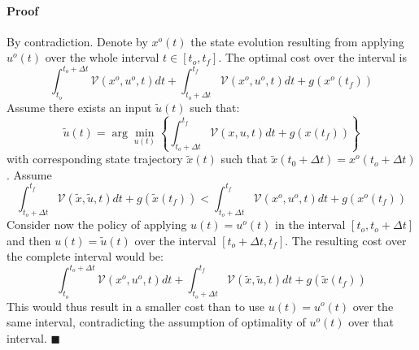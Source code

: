 \documentclass{book}
\newcommand{\argmin}{\arg\!\min}
\begin{document}
\paragraph{Proof}
By contradiction.
Denote by $ x^{ o } (t)  $ the state evolution resulting from 
applying $ u^{ o } (t)  $ over the whole interval $ t \in \left[ t_{ o }, t_{ f } \right]   $.
The optimal cost over the interval is
\begin{equation}
\int_{t_{ o }}^{t_{ o } + \Delta t} \mathcal{V} (x^{ o }, u^{ o }, t) dt +
\int_{t_{ o }+ \Delta t}^{t_{ f }} \mathcal{V} (x^{ o }, u^{ o }, t) dt + g (x^{ o } (t_{ f }))
\end{equation}
Assume there exists an input $ \tilde{u} (t)  $ such that:
\begin{equation}
\tilde{u} (t) = \argmin_{u (t)} \left\{ 
\int_{t_{ o } + \Delta t}^{t_{ f }} \mathcal{V} (x, u, t) dt + g (x (t_{ f }))
\right\} 
\end{equation}
with corresponding state trajectory $ \tilde{x} (t)  $ such that
$ \tilde{x} ( t_{ 0 } + \Delta t) = x^{ o } (t_{ o } + \Delta t)  $.
Assume
\begin{equation}
\int_{t_{ o } + \Delta t}^{t_{ f }} \mathcal{V} (\tilde{x}, \tilde{u}, t) dt + g (\tilde{x} (t_{ f })) <
\int_{t_{ o }+ \Delta t}^{t_{ f }} \mathcal{V} (x^{ o }, u^{ o }, t) dt + g (x^{ o } (t_{ f }))
\end{equation}
Consider now the policy of applying $ u (t) = u^{ o } (t)  $ in the interval
$ \left[ t_{ o }, t_{ o } + \Delta t \right]   $ and then
$ u (t) = \tilde{u} (t)  $ over the interval $ \left[ t_{ o } + \Delta t, t_{ f } \right]   $.
The resulting cost over the complete interval would be:
\begin{equation}
\int_{t_{ o }}^{t_{ o } + \Delta t} \mathcal{V} (x^{ o }, u^{ o }, t) dt +
\int_{t_{ o } + \Delta t}^{t_{ f }} \mathcal{V} (\tilde{x}, \tilde{u},t) dt + g (\tilde{x} (t_{ f }))
\end{equation}
This would thus result in a smaller cost than to use $ u (t) = u^{ o } (t)  $ over the same interval,
contradicting the assumption of optimality of $ u^{ o } (t)  $ over that interval. $   \blacksquare $
\end{document}
